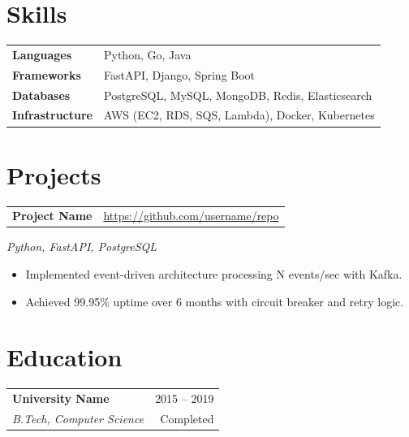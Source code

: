 \documentclass[10pt, a4paper]{article}
\makeatletter
\newcommand{\eduentry}[4]{%
  \noindent
  \begin{tabularx}{\linewidth}{@{}X r@{}}
    \textbf{#1} & \textcolor{subtle}{\small #4} \\
    \textit{\small #2} & \textcolor{subtle}{\small #3}
  \end{tabularx}
  \vspace{4pt}
}
\newcommand{\projectentry}[4]{%
  \noindent
  \begin{tabularx}{\linewidth}{@{}X r@{}}
    \textbf{#1} & \href{#3}{\textcolor{subtle}{\small #3}}
  \end{tabularx}
  \vspace{1pt}
  \textcolor{subtle}{\small \textit{#2}}
  \vspace{1pt}
  #4
  \vspace{6pt}
}
\makeatother
\begin{document}
\section{Skills}
\noindent
\begin{tabularx}{\linewidth}{@{} l X @{}}
  \textbf{Languages}      & Python, Go, Java \\[2pt]
  \textbf{Frameworks}     & FastAPI, Django, Spring Boot \\[2pt]
  \textbf{Databases}      & PostgreSQL, MySQL, MongoDB, Redis, Elasticsearch \\[2pt]
  \textbf{Infrastructure} & AWS (EC2, RDS, SQS, Lambda), Docker, Kubernetes \\
\end{tabularx}

\section{Projects}
\projectentry{Project Name}{Python, FastAPI, PostgreSQL}{https://github.com/username/repo}{%
  \begin{itemize}
    \item Implemented event-driven architecture processing N events/sec with Kafka.
    \item Achieved 99.95\% uptime over 6 months with circuit breaker and retry logic.
  \end{itemize}
}

\section{Education}
\eduentry{University Name}{B.Tech, Computer Science}{Completed}{2015 -- 2019}

\end{document}
